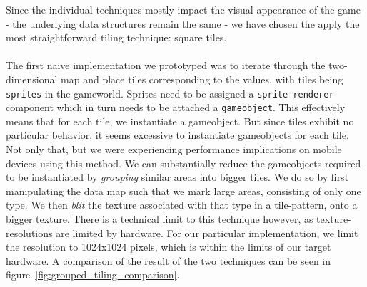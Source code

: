 Since the individual techniques mostly impact the visual appearance of the game
- the underlying data structures remain the same - we have chosen the apply the
most straightforward tiling technique: square tiles.
\\
\\
The first naive implementation we prototyped was to iterate through the
two-dimensional map and place tiles corresponding to the values, with tiles
being \texttt{sprites} in the gameworld. Sprites need to be assigned a
\texttt{sprite renderer} component which in turn needs to be attached a
\texttt{gameobject}. This effectively means that for each tile, we instantiate
a gameobject.  But since tiles exhibit no particular behavior, it seems
excessive to instantiate gameobjects for each tile. Not only that, but we were
experiencing performance implications on mobile devices using this method.  We
can substantially reduce the gameobjects required to be instantiated by
\textit{grouping} similar areas into bigger tiles. We do so by first
manipulating the data map such that we mark large areas, consisting of only one
type. We then \textit{blit} the texture associated with that type in a
tile-pattern, onto a bigger texture.  There is a technical limit to this
technique however, as texture-resolutions are limited by hardware. For our
particular implementation, we limit the resolution to 1024x1024 pixels, which
is within the limits of our target hardware. A comparison of the result of the
two techniques can be seen in figure~\ref{fig:grouped_tiling_comparison}.

